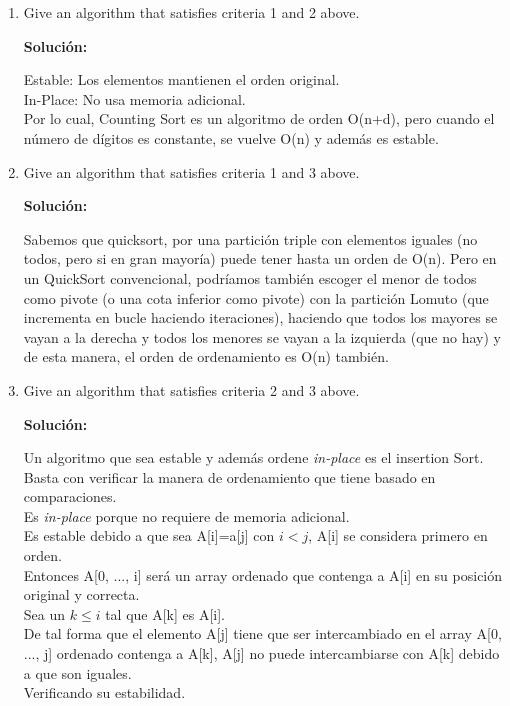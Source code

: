 \documentclass{article}
\begin{document}
\begin{enumerate}[label=(\alph*)]
  \item Give an algorithm that satisfies criteria 1 and 2 above.
  
  \textbf{Solución:}
  
  Estable: Los elementos mantienen el orden original.\\
  In-Place: No usa memoria adicional.\\
  Por lo cual, Counting Sort es un algoritmo de orden O(n+d), pero cuando el número de dígitos es constante, se vuelve O(n) y además es estable.
  
  \item Give an algorithm that satisfies criteria 1 and 3 above.
  
  \textbf{Solución:}
  
  Sabemos que quicksort, por una partición triple con elementos iguales (no todos, pero si en gran mayoría) puede tener hasta un orden de O(n). Pero en un QuickSort convencional, podríamos también escoger el menor de todos como pivote (o una cota inferior como pivote) con la partición Lomuto (que incrementa en bucle haciendo iteraciones), haciendo que todos los mayores se vayan a la derecha y todos los menores se vayan a la izquierda (que no hay) y de esta manera, el orden de ordenamiento es O(n) también.
   
  \item Give an algorithm that satisfies criteria 2 and 3 above.
  
  \textbf{Solución:}
  
  Un algoritmo que sea estable y además ordene \textit{in-place} es el insertion Sort.\\
  Basta con verificar la manera de ordenamiento que tiene basado en comparaciones.\\
  Es \textit{in-place} porque no requiere de memoria adicional.\\
  Es estable debido a que sea A[i]=a[j] con $i<j$, A[i] se considera primero en orden.\\
  Entonces A[0, ..., i] será un array ordenado que contenga a A[i] en su posición original y correcta.\\
  Sea un $k \leq i$ tal que A[k] es A[i].\\
  De tal forma que el elemento A[j] tiene que ser intercambiado en el array A[0, ..., j] ordenado contenga a A[k], A[j] no puede intercambiarse con A[k] debido a que son iguales.\\
  Verificando su estabilidad.
    

\end{enumerate}
\end{document}
